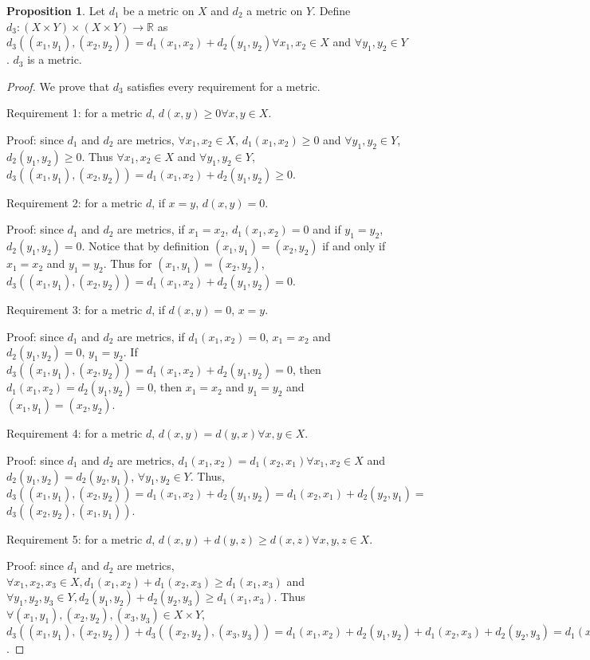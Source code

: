 \documentclass[12pt]{article}
\theoremstyle{definition}
\newtheorem*{proposition}{Proposition}
\newcommand{\RR}{\mathbb{R}}
\begin{document}
\begin{proposition}
Let $d_1$ be a metric on $X$ and $d_2$ a metric on $Y$. Define $d_3: (X \times Y) \times (X \times Y)\rightarrow \RR$ as $d_3((x_1, y_1),(x_2, y_2))=d_1(x_1,x_2)+d_2(y_1,y_2) \forall x_1, x_2 \in X$ and $\forall y_1, y_2 \in Y$. $d_3$ is a metric.
\end{proposition}
\begin{proof}
We prove that $d_3$ satisfies every requirement for a metric.

Requirement 1: for a metric $d$, $d(x,y)\geq 0 \forall x, y \in X$.

Proof: since $d_1$ and $d_2$ are metrics, $\forall x_1, x_2 \in X$, $d_1(x_1, x_2)\geq 0$ and $\forall y_1, y_2 \in Y$, $d_2(y_1, y_2)\geq 0$. Thus $\forall x_1, x_2 \in X$ and $\forall y_1, y_2 \in Y$, $d_3((x_1, y_1),(x_2, y_2))=d_1(x_1,x_2)+d_2(y_1,y_2) \geq 0$.

Requirement 2: for a metric $d$, if $x=y$, $d(x,y)=0$.

Proof: since $d_1$ and $d_2$ are metrics, if $x_1=x_2$, $d_1(x_1, x_2)=0$ and if $y_1=y_2$, $d_2(y_1, y_2)=0$. Notice that by definition $(x_1, y_1)=(x_2, y_2)$ if and only if $x_1=x_2$ and $y_1=y_2$. Thus for $(x_1, y_1)=(x_2, y_2)$, $d_3((x_1, y_1),(x_2, y_2))=d_1(x_1,x_2)+d_2(y_1,y_2)=0$.

Requirement 3: for a metric $d$, if $d(x,y)=0$, $x=y$.

Proof: since $d_1$ and $d_2$ are metrics, if $d_1(x_1,x_2)=0$, $x_1=x_2$ and $d_2(y_1,y_2)=0$, $y_1=y_2$. If $d_3((x_1, y_1),(x_2, y_2))=d_1(x_1,x_2)+d_2(y_1,y_2)=0$, then $d_1(x_1,x_2)=d_2(y_1,y_2)=0$, then $x_1=x_2$ and $y_1=y_2$ and $(x_1, y_1)=(x_2,y_2)$.

Requirement 4: for a metric $d$, $d(x,y)=d(y,x) \forall x, y \in X$.

Proof: since $d_1$ and $d_2$ are metrics, $d_1(x_1, x_2)=d_1(x_2, x_1) \forall x_1, x_2 \in X$ and $d_2(y_1, y_2)=d_2(y_2, y_1)$, $\forall y_1, y_2 \in Y$. Thus, $d_3((x_1, y_1),(x_2, y_2))=d_1(x_1,x_2)+d_2(y_1,y_2)=d_1(x_2, x_1)+d_2(y_2, y_1)=$\newline$d_3((x_2, y_2),(x_1, y_1))$.

Requirement 5: for a metric $d$, $d(x,y)+d(y,z)\geq d(x,z) \forall x,y,z \in X$.

Proof: since $d_1$ and $d_2$ are metrics, $\forall x_1, x_2, x_3 \in X, d_1(x_1, x_2)+d_1(x_2,x_3)\geq d_1(x_1, x_3)$ and $\forall y_1, y_2, y_3 \in Y, d_2(y_1, y_2)+d_2(y_2,y_3)\geq d_1(x_1, x_3)$. Thus $\forall (x_1, y_1), (x_2, y_2), (x_3, y_3) \in X \times Y$, \newline$d_3((x_1, y_1),(x_2, y_2)) + d_3((x_2, y_2),(x_3, y_3))=d_1(x_1, x_2)+d_2(y_1, y_2)+d_1(x_2, x_3)+d_2(y_2, y_3)=d_1(x_1, x_2)+d_1(x_2, x_3)+d_2(y_1, y_2)+d_2(y_2, y_3)\geq d_1(x_1, x_3)+d_2(y_1, y_3)=d_3((x_1,y_1),(x_3,y_3))$.
\end{proof}
\end{document}
